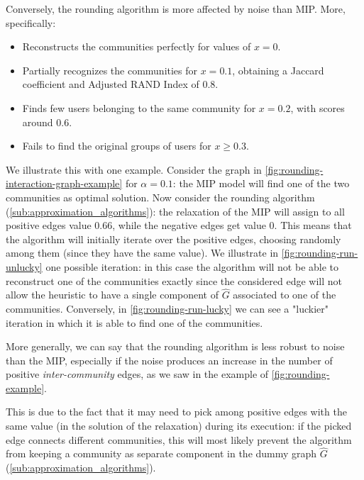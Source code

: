 Conversely, the rounding algorithm is more affected by noise than MIP. More,
specifically:
\begin{itemize}
	\item Reconstructs the communities perfectly for values of $x = 0$.
	\item Partially recognizes the communities for $x= 0.1$, obtaining a
	      Jaccard coefficient and Adjusted RAND Index of $0.8$.
	\item Finds few users belonging to the same community for $x = 0.2$, with
	      scores around $0.6$.
	\item Fails to find the original groups of users for $x \geq 0.3$.
\end{itemize}
We illustrate this with one example. Consider the graph in
\autoref{fig:rounding-interaction-graph-example} for $\alpha = 0.1$:
the MIP model will find one of the two communities as optimal solution.
Now consider the rounding algorithm (\autoref{sub:approximation_algorithms}):
the relaxation of the MIP will assign to all positive edges value
$0.66$, while the negative edges get value $0$. This means that the algorithm
will initially iterate over the positive edges, choosing randomly among them (since they have the same value).
We illustrate in \autoref{fig:rounding-run-unlucky} one possible iteration: in
this case the algorithm will not be able to reconstruct one of the communities
exactly since the considered edge will not allow the heuristic to have a single component of
$\hat{G}$ associated to one of the communities.
Conversely, in \autoref{fig:rounding-run-lucky} we can see a "luckier"
iteration in which it is able to find one of the communities.

More generally, we can say that the rounding algorithm is less robust to noise
than the MIP, especially if the noise produces an increase in the number of
positive \emph{inter-community} edges, as we saw in the example of
\autoref{fig:rounding-example}.

This is due to the fact that it may need to pick among positive edges with the
same value (in the solution of the relaxation) during its execution: if the picked edge connects different communities, this will most
likely prevent the algorithm from keeping a community as separate component in
the dummy graph $\hat{G}$ (\autoref{sub:approximation_algorithms}).



